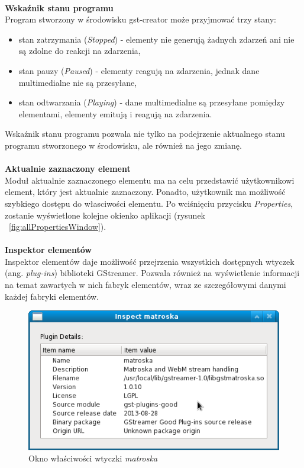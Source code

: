 \documentclass[12pt]{article}
\begin{document}
\paragraph{}\vspace{-3mm}
\textbf{Wskaźnik stanu programu} \\
Program stworzony w środowisku gst-creator może przyjmować trzy stany:
\begin{itemize}
\item stan zatrzymania (\textit{Stopped}) - elementy nie generują żadnych zdarzeń ani nie są zdolne do reakcji na zdarzenia,
\item stan pauzy (\textit{Paused}) - elementy reagują na zdarzenia, jednak dane multimedialne nie są przesyłane,
\item stan odtwarzania (\textit{Playing}) - dane multimedialne są przesyłane pomiędzy elementami, elementy emitują i reagują na zdarzenia.
\end{itemize}
Wskaźnik stanu programu pozwala nie tylko na podejrzenie aktualnego stanu programu stworzonego w środowisku, ale również na jego zmianę. \paragraph{}\vspace{-3mm}
\textbf{Aktualnie zaznaczony element} \\
Moduł aktualnie zaznaczonego elementu ma na celu przedstawić użytkownikowi element, który jest aktualnie zaznaczony. Ponadto, użytkownik ma możliwość szybkiego dostępu do własciwości elementu. Po wciśnięciu przycisku \textit{Properties}, zostanie wyświetlone kolejne okienko aplikacji (rysunek ~\ref{fig:allPropertiesWindow}). \paragraph{}\vspace{-3mm}
\textbf{Inspektor elementów} \\
Inspektor elementów daje możliwość przejrzenia wszystkich dostępnych wtyczek (ang. \textit{plug-ins}) biblioteki GStreamer. Pozwala również na wyświetlenie informacji na temat zawartych w nich fabryk elementów, wraz ze szczegółowymi danymi każdej fabryki elementów. 
\begin{figure}[H]
  \includegraphics[width=12cm]{img/matroska-inspect-window.png}
  \caption{Okno właściwości wtyczki \textit{matroska}}
  \label{fig:matroskaInspectWindow}
\end{figure}
\end{document}
